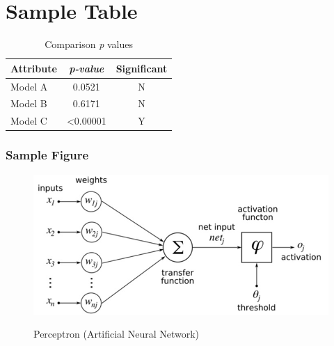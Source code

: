 \documentclass[12pt]{article}
\begin{document}
\section{Sample Table}
\begin{table}[ht!]
\centering
    
	\caption{Comparison \textit{p} values}
	\begin{tabular}{ |l|c|c|}	
		\hline		
		\textbf{Attribute} & \textbf{\textit{p-value}} & \textbf{Significant} \\ \hline
		Model A	 & 0.0521 & N \\ \hline
		Model B  & 0.6171 & N \\ \hline 
		Model C  & <0.00001 & Y \\ \hline 
	\end{tabular}
	\label{tab:pvalues}
\end{table} 


\subsubsection{Sample Figure}
\begin{figure}[ht!]
 	\centering
 	\caption{Perceptron (Artificial Neural Network)}
 	\includegraphics[width=0.7\linewidth]{images/ANN.jpg}
 	\label{lab:perceptron}
 \end{figure}
\pagebreak





\renewcommand{\bibname}{References} %
\end{document}
